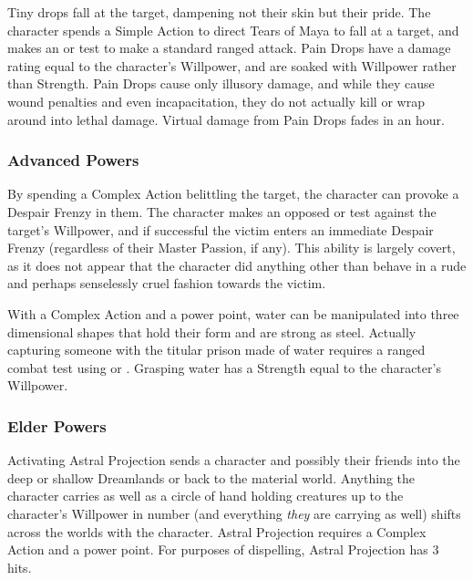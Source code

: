  Tiny drops fall at the target, dampening not their skin but their pride. The character spends a Simple Action to direct Tears of Maya to fall at a target, and makes an  or  test to make a standard ranged attack. Pain Drops have a damage rating equal to the character's Willpower, and are soaked with Willpower rather than Strength. Pain Drops cause only illusory damage, and while they cause wound penalties and even incapacitation, they do not actually kill or wrap around into lethal damage. Virtual damage from Pain Drops fades in an hour.

\subsubsection{Advanced Powers}

 By spending a Complex Action belittling the target, the character can provoke a Despair Frenzy in them. The character makes an opposed  or  test against the target's Willpower, and if successful the victim enters an immediate Despair Frenzy (regardless of their Master Passion, if any). This ability is largely covert, as it does not appear that the character did anything other than behave in a rude and perhaps senselessly cruel fashion towards the victim.

 With a Complex Action and a power point, water can be manipulated into three dimensional shapes that hold their form and are strong as steel. Actually capturing someone with the titular prison made of water requires a ranged combat test using  or . Grasping water has a Strength equal to the character's Willpower.

\subsubsection{Elder Powers}

 Activating Astral Projection sends a character and possibly their friends into the deep or shallow Dreamlands or back to the material world. Anything the character carries as well as a circle of hand holding creatures up to the character's Willpower in number (and everything \textit{they} are carrying as well) shifts across the worlds with the character. Astral Projection requires a Complex Action and a power point. For purposes of dispelling, Astral Projection has 3 hits.

